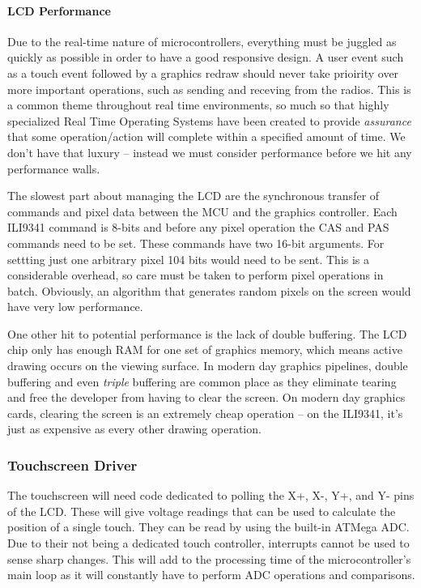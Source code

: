 \paragraph{LCD Performance}
\label{par:lcd-perf}
Due to the real-time nature of microcontrollers, everything must be juggled as
quickly as possible in order to have a good responsive design. A user event
such as a touch event followed by a graphics redraw should never take prioirity
over more important operations, such as sending and receving from the radios.
This is a common theme
throughout real time environments, so much so that highly specialized Real Time
Operating Systems have been created to provide \emph{assurance} that some
operation/action will complete within a specified amount of time. We don't have that luxury -- instead we must consider performance before we hit any performance walls.

The slowest part about managing the LCD are the synchronous transfer of
commands and pixel data between the MCU and the graphics controller. Each
ILI9341 command is 8-bits and before any pixel operation the CAS and PAS
commands need to be set. These commands have two 16-bit arguments.
For settting just one arbitrary pixel 104 bits would need to be sent. This is a
considerable overhead, so care must be taken to perform pixel operations in
batch. Obviously, an algorithm that generates random pixels on the screen would have very
low performance.

One other hit to potential performance is the lack of double buffering. The LCD
chip only has enough RAM for one set of graphics memory, which means active
drawing occurs on the viewing surface. In modern day graphics pipelines, double
buffering and even \emph{triple} buffering are common place as they eliminate
tearing and free the developer from having to clear the screen. On modern day
graphics cards, clearing the screen is an extremely cheap operation -- on the
ILI9341, it's just as expensive as every other drawing operation.


\subsubsection{Touchscreen Driver}
The touchscreen will need code dedicated to polling the X+, X-, Y+, and Y- pins
of the LCD. These will give voltage readings that can be used to calculate the
position of a single touch. They can be read by using the built-in ATMega ADC.
Due to their not being a dedicated touch controller,
interrupts cannot be used to sense sharp changes. This will add to the
processing time of the microcontroller's main loop as it will constantly have
to perform ADC operations and comparisons.

